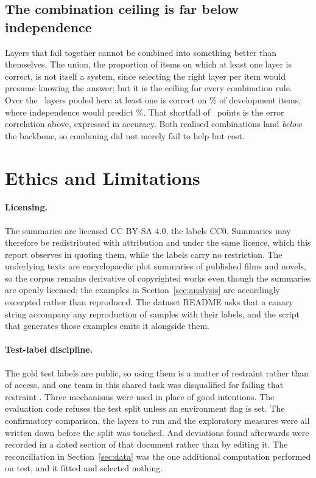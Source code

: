 \documentclass[11pt,letterpaper,twocolumn]{article}
\begin{document}
\subsection{The combination ceiling is far below independence}
Layers that fail together cannot be combined into something better than
themselves. The union, the proportion of items on which at least one layer is
correct, is not itself a system, since selecting the right layer per item would
presume knowing the answer; but it is the ceiling for every combination rule. Over the \PoolSize\ layers pooled here at least one is
correct on \OracleUnion\% of development items, where independence would
predict \OracleIndep\%. That shortfall of \OracleShortfall\ points is the
error correlation above, expressed in accuracy. Both realised combinations land
\emph{below} the backbone, so combining did not merely fail to help but cost.

\section{Ethics and Limitations}\label{sec:ethics}
\paragraph{Licensing.} The summaries are licensed CC BY-SA 4.0, the labels  %
CC0. Summaries may therefore be redistributed with attribution and under the
same licence, which this report observes in quoting them, while the labels
carry no restriction. The underlying texts are encyclopaedic plot summaries of
published films and novels, so the corpus remains derivative of copyrighted
works even though the summaries are openly licensed; the examples in
Section~\ref{sec:analysis} are accordingly excerpted rather than reproduced.
The dataset README asks that a canary string accompany any reproduction of
samples with their labels, and the script that generates those examples emits
it alongside them.

\paragraph{Test-label discipline.} The gold test labels are public, so using
them is a matter of restraint rather than of access, and one team in this
shared task was disqualified for failing that restraint \citep{hatzel2026}.
Three mechanisms were used in place of good intentions. The evaluation code
refuses the test split unless an environment flag is set. The confirmatory
comparison, the layers to run and the exploratory measures were all written
down before the split was touched. And deviations found afterwards were
recorded in a dated section of that document rather than by editing it. The
reconciliation in Section~\ref{sec:data} was the one additional computation
performed on test, and it fitted and selected nothing.
\end{document}
